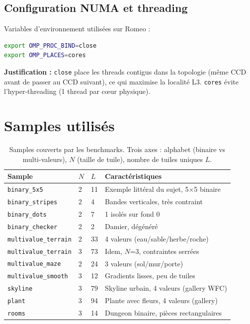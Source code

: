 \subsection{Configuration NUMA et threading}

Variables d'environnement utilisées sur Romeo :
\begin{lstlisting}[language=bash]
export OMP_PROC_BIND=close
export OMP_PLACES=cores
\end{lstlisting}

\textbf{Justification :} \texttt{close} place les threads contigus dans la topologie (même CCD avant de passer au CCD suivant), ce qui maximise la localité L3. \texttt{cores} évite l'hyper-threading (1 thread par cœur physique).

\section{Samples utilisés}
\label{sec:proto:samples}

\begin{table}[H]
\centering
\begin{tabularx}{\textwidth}{llXX}
\toprule
\textbf{Sample} & \textbf{$N$} & \textbf{$L$} & \textbf{Caractéristiques} \\
\midrule
\texttt{binary\_5x5} & 2 & 11 & Exemple littéral du sujet, 5×5 binaire \\
\texttt{binary\_stripes} & 2 & 4 & Bandes verticales, très contraint \\
\texttt{binary\_dots} & 2 & 7 & 1 isolés sur fond 0 \\
\texttt{binary\_checker} & 2 & 2 & Damier, dégénéré \\
\texttt{multivalue\_terrain} & 2 & 33 & 4 valeurs (eau/sable/herbe/roche) \\
\texttt{multivalue\_terrain} & 3 & 73 & Idem, $N$=3, contraintes serrées \\
\texttt{multivalue\_maze} & 2 & 24 & 3 valeurs (sol/mur/porte) \\
\texttt{multivalue\_smooth} & 3 & 12 & Gradients lisses, peu de tuiles \\
\texttt{skyline} & 3 & 79 & Skyline urbain, 4 valeurs (gallery WFC) \\
\texttt{plant} & 3 & 94 & Plante avec fleurs, 4 valeurs (gallery) \\
\texttt{rooms} & 3 & 14 & Dungeon binaire, pièces rectangulaires \\
\bottomrule
\end{tabularx}
\caption{Samples couverts par les benchmarks. Trois axes : alphabet (binaire vs multi-valeurs), $N$ (taille de tuile), nombre de tuiles uniques $L$.}
\label{tab:proto:samples}
\end{table}

